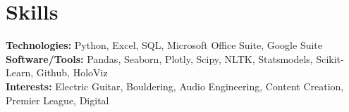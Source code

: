 \documentclass[letterpaper,11pt]{article}
\begin{document}
\section{Skills}
\textbf{Technologies:} Python, Excel, SQL, Microsoft Office Suite, Google Suite \\
\textbf{Software/Tools:} Pandas, Seaborn, Plotly, Scipy, NLTK, Statsmodels, Scikit-Learn, Github, HoloViz \\
\textbf{Interests:} Electric Guitar, Bouldering, Audio Engineering, Content Creation, Premier League, Digital
\end{document}
